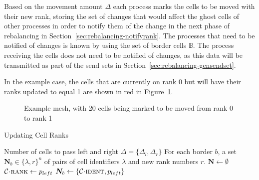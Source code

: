 \documentclass[twoside]{IIBproject}
\newcommand{\vect} [1] {\bm{#1}}
\newcommand{\acc}{{\mkern 0.5mu\cdot\mkern 0.5mu}}
\numberwithin{figure}{section}
\begin{document}
            Based on the movement amount $\Delta$ each process marks the cells to be moved with their new rank, storing the set of changes that would affect the ghost cells of other processes in order to notify them of the change in the next phase of rebalancing in Section~\ref{sec:rebalancing-notifyrank}. The processes that need to be notified of changes is known by using the set of border cells $\mathbb{B}$. The process receiving the cells does not need to be notified of changes, as this data will be transmitted as part of the send sets in Section~\ref{sec:rebalancing-gensendset}.

            In the example case, the cells that are currently on rank 0 but will have their ranks updated to equal 1 are shown in red in Figure~\ref{fig:rebalance-ranks}.

            \begin{figure}[H]
                
                \caption{Example mesh, with 20 cells being marked to be moved from rank 0 to rank 1}
                \label{fig:rebalance-ranks}
            \end{figure}

            \begin{algorithm}[H]
                \caption{Updating Cell Ranks}
                \label{alg:rebalance-updateranks}

                \begin{algorithmic}
                    \Require Number of cells to pass left and right $\Delta = \{\Delta_l,\Delta_r\}$
                    \Ensure For each border $b$, a set $\vect{N}_b \in \{\lambda,r\}^n$ of pairs of cell identifiers $\lambda$ and new rank numbers $r$.
                    \Statex
                    \State $\vect{N} \gets \emptyset$
                        \State $\mathcal{C} \acc \textproc{rank} \gets p_{left}$
                                \State $\vect{N}_b \gets \{\mathcal{C} \acc \textproc{ident} , p_{left}\}$
                            \EndIf
                        \EndFor
                    \EndFor
                \end{algorithmic}
            \end{algorithm}
\end{document}
